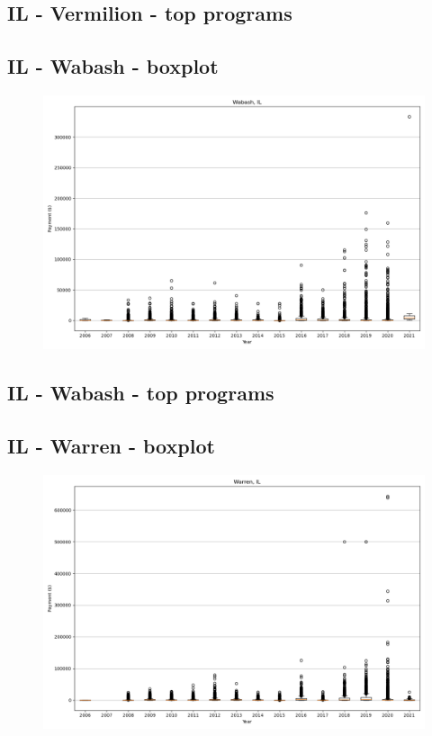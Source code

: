 \subsection*{IL - Vermilion - top programs}

\newpage
\subsection*{IL - Wabash - boxplot}
\begin{figure}[h]
\centering
\includegraphics[width=7in]{../output/boxplots/counties/Wabash-IL_boxplot.png}
\end{figure}


\subsection*{IL - Wabash - top programs}

\newpage
\subsection*{IL - Warren - boxplot}
\begin{figure}[h]
\centering
\includegraphics[width=7in]{../output/boxplots/counties/Warren-IL_boxplot.png}
\end{figure}


